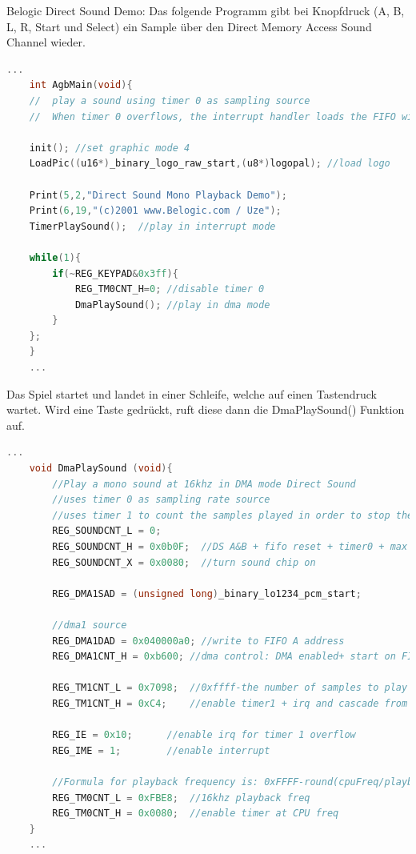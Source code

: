 \documentclass[11pt,a4paper]{scrartcl}
\begin{document}
Belogic Direct Sound Demo:\newline
Das folgende Programm gibt bei Knopfdruck (A, B, L, R, Start und Select) ein Sample \"uber den Direct Memory Access Sound Channel wieder.

\newpage
\begin{lstlisting}[language=C++, caption={Belogic Direct Sound Demo}, label={list:directsound1}]
    ...
	int AgbMain(void){
	//	play a sound using timer 0 as sampling source
	//	When timer 0 overflows, the interrupt handler loads the FIFO with the next sample
	
	init(); //set graphic mode 4
	LoadPic((u16*)_binary_logo_raw_start,(u8*)logopal); //load logo

	Print(5,2,"Direct Sound Mono Playback Demo");
	Print(6,19,"(c)2001 www.Belogic.com / Uze");
	TimerPlaySound();  //play in interrupt mode

	while(1){
		if(~REG_KEYPAD&0x3ff){
			REG_TM0CNT_H=0;	//disable timer 0
			DmaPlaySound(); //play in dma mode
		}
	};
	}
	...
\end{lstlisting}

Das Spiel startet und landet in einer Schleife, welche auf einen Tastendruck wartet. Wird eine Taste gedr\"uckt, ruft diese dann die DmaPlaySound() Funktion auf.\newline

\begin{lstlisting}[language=C++, caption={Belogic DmaPlaySound()}, label={list:directsound2}]
    ...
    void DmaPlaySound (void){
        //Play a mono sound at 16khz in DMA mode Direct Sound
	    //uses timer 0 as sampling rate source
	    //uses timer 1 to count the samples played in order to stop the sound 
	    REG_SOUNDCNT_L = 0;
	    REG_SOUNDCNT_H = 0x0b0F;  //DS A&B + fifo reset + timer0 + max volume to L and R
	    REG_SOUNDCNT_X = 0x0080;  //turn sound chip on

	    REG_DMA1SAD = (unsigned long)_binary_lo1234_pcm_start;
	   
	    //dma1 source
	    REG_DMA1DAD = 0x040000a0; //write to FIFO A address
	    REG_DMA1CNT_H = 0xb600;	//dma control: DMA enabled+ start on FIFO+32bit+repeat

	    REG_TM1CNT_L = 0x7098;	//0xffff-the number of samples to play
	    REG_TM1CNT_H = 0xC4;	//enable timer1 + irq and cascade from timer 0

	    REG_IE = 0x10;	  	//enable irq for timer 1 overflow
	    REG_IME = 1;		//enable interrupt
	
	    //Formula for playback frequency is: 0xFFFF-round(cpuFreq/playbackFreq)
	    REG_TM0CNT_L = 0xFBE8;	//16khz playback freq
	    REG_TM0CNT_H = 0x0080; 	//enable timer at CPU freq 
    }
    ...
\end{lstlisting}
\end{document}
